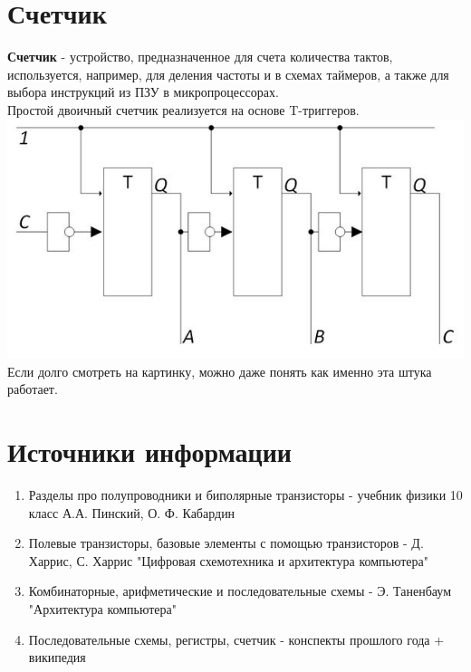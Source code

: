 \documentclass[12pt, a4paper]{article}
\begin{document}
\section{Счетчик}
\textbf{Счетчик} - устройство, предназначенное для счета количества тактов, используется, например, для деления частоты и в схемах таймеров, а также для выбора инструкций из ПЗУ в микропроцессорах.\\
Простой двоичный счетчик реализуется на основе T-триггеров.\\
\includegraphics[scale=0.4]{./images/counter.jpg}\\
Если долго смотреть на картинку, можно даже понять как именно эта штука работает.
\section{Источники информации}
\begin{enumerate}
    \item Разделы про полупроводники и биполярные транзисторы - учебник физики 10 класс А.А. Пинский, О. Ф. Кабардин
    \item Полевые транзисторы, базовые элементы с помощью транзисторов - Д. Харрис, С. Харрис "Цифровая схемотехника и архитектура компьютера"
    \item Комбинаторные, арифметические и последовательные схемы - Э. Таненбаум "Архитектура компьютера"
    \item Последовательные схемы, регистры, счетчик - конспекты прошлого года + википедия
\end{enumerate}
\end{document}

